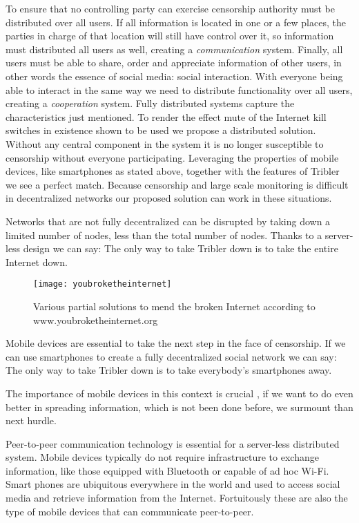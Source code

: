 To ensure that no controlling party can exercise censorship authority must be distributed over all users. %
If all information is located in one or a few places, the parties in charge of that location will still have control over it, so information must distributed all users as well, creating a \emph{communication} system.
Finally, all users must be able to share, order and appreciate information of other users, in other words the essence of social media: social interaction.
With everyone being able to interact in the same way we need to  distribute functionality over all users, creating a \emph{cooperation} system.
Fully distributed systems capture the characteristics just mentioned.
To render the effect mute of the Internet kill switches in existence shown to be used we propose a distributed solution.
Without any central component in the system it is no longer susceptible to censorship without everyone participating.
Leveraging the properties of mobile devices, like smartphones as stated above, together with the features of Tribler we see a perfect match.
Because censorship and large scale monitoring is difficult in decentralized networks our proposed solution can work in these situations.

Networks that are not fully decentralized can be disrupted by taking down a limited number of nodes, less than the total number of nodes.
Thanks to a server-less design we can say:
The only way to take Tribler down is to take the entire Internet down.

\begin{figure}[H]
	\centering
	\texttt{[image: youbroketheinternet]}
	\caption{Various partial solutions to mend the broken Internet according to www.youbroketheinternet.org}
	\label{fig:youbroketheinternet}
\end{figure}

Mobile devices are essential to take the next step in the face of censorship.
If we can use smartphones to create a fully decentralized social network we can say:
The only way to take Tribler down is to take everybody's smartphones away.

The importance of mobile devices in this context is crucial , if we want to do even better in spreading information, which is not been done before, we surmount than next hurdle.

Peer-to-peer communication technology is essential for a server-less distributed system.
Mobile devices typically do not require infrastructure to exchange information, like those equipped with Bluetooth or capable of ad hoc Wi-Fi.
Smart phones are ubiquitous everywhere in the world and used to access social media and retrieve information from the Internet.
Fortuitously these are also the type of mobile devices that can communicate peer-to-peer.


